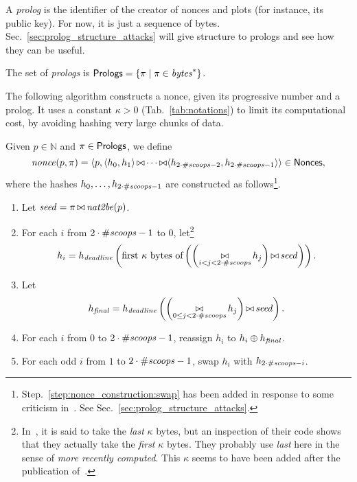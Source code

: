 A \emph{prolog} is the identifier of the creator of nonces and plots (for instance, its public key).
For now, it is just a sequence of bytes. Sec.~\ref{sec:prolog_structure_attacks}
will give structure to prologs and see how they can be useful.
%
\begin{definition}[Prolog]\label{def:prolog}
  The set of \emph{prologs} is ${\mathsf{Prologs}}=\{\pi\mid\pi\in\mathit{bytes}^*\}$.
\end{definition}
%
The following algorithm constructs a nonce, given its progressive number and a prolog.
It uses a constant $\kappa>0$ (Tab.~\ref{tab:notations})
to limit its computational cost, by avoiding hashing very large chunks of data.
%
\begin{alg}[$\nonce(p,\pi)$]\label{alg:nonce_construction}
  Given $p\in\mathbb{N}$ and $\pi\in{\mathsf{Prologs}}$, we define
  \[
  {\mathit{nonce}}(p,\pi)=\langle p,\langle h_0,h_1\rangle\operatorname*{\bowtie}
  \cdots\operatorname*{\bowtie}\langle h_{2\cdot{\#\mathit{scoops}}-2},h_{2\cdot{\#\mathit{scoops}}-1}\rangle\rangle\in{\mathsf{Nonces}},
  \]
  where the hashes $h_0,\ldots,h_{2\cdot{\#\mathit{scoops}}-1}$ are constructed as
  follows\footnote{Step.~\ref{step:nonce_construction:swap} has been added
  in response to some criticism in~\cite{ParkKFGAP18}. See Sec.~\ref{sec:prolog_structure_attacks}.}.
  \begin{enumerate}
  \item Let ${\mathit{seed}}=\pi\operatorname*{\bowtie}{\mathit{nat2be}}(p)$.
  \item\label{step:nonce_construction:first_hash}
    For each $i$ from $2\cdot{\#\mathit{scoops}}-1$ to $0$,
    let\footnote{In~\cite{SignumPlotting}, it is said to
    take the \emph{last} $\kappa$ bytes, but an inspection of their code
    shows that they actually take the \emph{first} $\kappa$ bytes. They
    probably use \emph{last} here in the sense of \emph{more recently computed}.
    This $\kappa$ seems to have been added after the
    publication of~\cite{ParkKFGAP18}.}
    \[
    h_i=h_{\mathit{deadline}}\left(\text{first $\kappa$ bytes of}\left(\left(\operatorname*{\bowtie}_{i<j<2\cdot{\#\mathit{scoops}}}h_j\right)\operatorname*{\bowtie}{\mathit{seed}}\right)\right).
    \]
  \item\label{step:nonce_construction:final_hash}
    Let
    \[
    {h_{\mathit{final}}}=h_{\mathit{deadline}}\left(\left(\operatorname*{\bowtie}_{0\le j<2\cdot{\#\mathit{scoops}}}h_j\right)\operatorname*{\bowtie}{\mathit{seed}}\right).
    \]
  \item For each $i$ from $0$ to $2\cdot{\#\mathit{scoops}}-1$, reassign
    $h_i$ to $h_i\oplus{h_{\mathit{final}}}$.
  \item\label{step:nonce_construction:swap}
    For each odd $i$ from $1$ to $2\cdot{\#\mathit{scoops}}-1$, swap
    $h_i$ with $h_{2\cdot{\#\mathit{scoops}}-i}$.
  \end{enumerate}
\end{alg}
